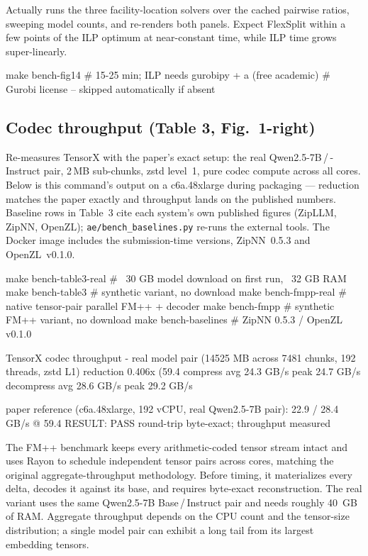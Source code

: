 \documentclass[11pt]{article}
\newcommand{\code}[1]{\texttt{#1}}
\begin{document}
Actually runs the three facility-location solvers over the cached pairwise
ratios, sweeping model counts, and re-renders both panels. Expect FlexSplit
within a few points of the ILP optimum at near-constant time, while ILP time
grows super-linearly.

\begin{shell}
make bench-fig14    # 15-25 min; ILP needs gurobipy + a (free academic)
                    # Gurobi license -- skipped automatically if absent
\end{shell}

\subsection{Codec throughput (Table 3, Fig.~1-right)}

Re-measures TensorX with the paper's exact setup: the real
Qwen2.5-7B\,/\,-Instruct pair, 2\,MB sub-chunks, zstd level~1, pure codec
compute across all cores. Below is this command's output on a c6a.48xlarge
during packaging --- reduction matches the paper exactly and throughput lands
on the published numbers. Baseline rows in Table~3 cite each system's own
published figures (ZipLLM, ZipNN, OpenZL); \code{ae/bench\_baselines.py}
re-runs the external tools. The Docker image includes the submission-time
versions, ZipNN~0.5.3 and OpenZL~v0.1.0.

\begin{shell}
make bench-table3-real   # ~30 GB model download on first run, ~32 GB RAM
make bench-table3        # synthetic variant, no download
make bench-fmpp-real     # native tensor-pair parallel FM++ + decoder
make bench-fmpp          # synthetic FM++ variant, no download
make bench-baselines     # ZipNN 0.5.3 / OpenZL v0.1.0
\end{shell}
\begin{term}
TensorX codec throughput - real model pair (14525 MB across 7481
chunks, 192 threads, zstd L1)
  reduction    0.406x (59.4%
  compress     avg   24.3 GB/s   peak   24.7 GB/s
  decompress   avg   28.6 GB/s   peak   29.2 GB/s

paper reference (c6a.48xlarge, 192 vCPU, real Qwen2.5-7B pair):
  22.9 / 28.4 GB/s @ 59.4%
RESULT: PASS  round-trip byte-exact; throughput measured
\end{term}

The FM++ benchmark keeps every arithmetic-coded tensor stream intact and uses
Rayon to schedule independent tensor pairs across cores, matching the original
aggregate-throughput methodology. Before timing, it materializes every delta,
decodes it against its base, and requires byte-exact reconstruction. The real
variant uses the same Qwen2.5-7B Base\,/\,Instruct pair and needs roughly
40~GB of RAM. Aggregate throughput depends on the CPU count and the tensor-size
distribution; a single model pair can exhibit a long tail from its largest
embedding tensors.
\end{document}
